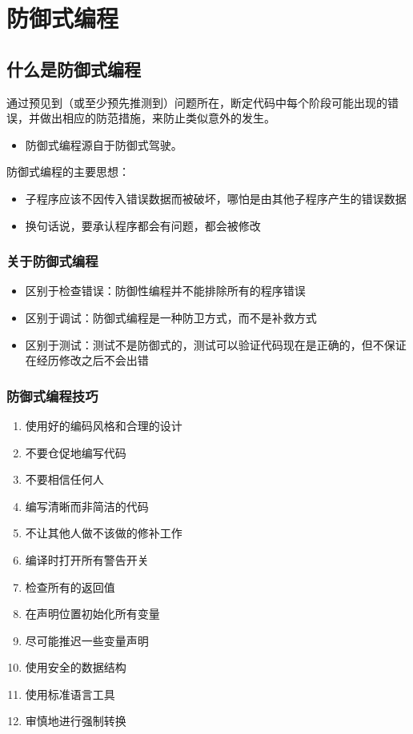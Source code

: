 \section{防御式编程}

\subsection{什么是防御式编程}
通过预见到（或至少预先推测到）问题所在，断定代码中每个阶段可能出现的错误，并做出相应的防范措施，来防止类似意外的发生。
\begin{itemize}
    \item 防御式编程源自于防御式驾驶。
\end{itemize}

防御式编程的主要思想：
\begin{itemize}
    \item 子程序应该不因传入错误数据而被破坏，哪怕是由其他子程序产生的错误数据
    \item 换句话说，要承认程序都会有问题，都会被修改
\end{itemize}

\subsubsection{关于防御式编程}
\begin{itemize}
    \item 区别于检查错误：防御性编程并不能排除所有的程序错误
    \item 区别于调试：防御式编程是一种防卫方式，而不是补救方式
    \item 区别于测试：测试不是防御式的，测试可以验证代码现在是正确的，但不保证在经历修改之后不会出错
\end{itemize}

\subsubsection{防御式编程技巧}
\vspace{-0.8em}
\begin{multicols}{2}
    \begin{enumerate}[label=\arabic*.]
        \item 使用好的编码风格和合理的设计
        \item 不要仓促地编写代码
        \item 不要相信任何人
        \item 编写清晰而非简洁的代码
        \item 不让其他人做不该做的修补工作
        \item 编译时打开所有警告开关
        \item 检查所有的返回值
        \item 在声明位置初始化所有变量
        \item 尽可能推迟一些变量声明
        \item 使用安全的数据结构
        \item 使用标准语言工具
        \item 审慎地进行强制转换
    \end{enumerate}
\end{multicols}
\vspace{-1em}

